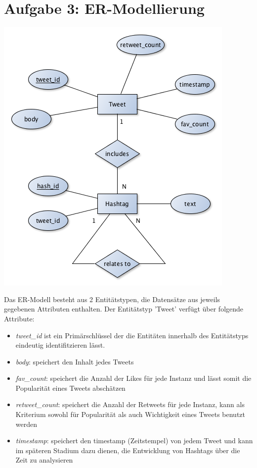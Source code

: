 \documentclass[12pt]{article}
\begin{document}
\section*{Aufgabe 3: ER-Modellierung}
\centerline{\includegraphics[scale=0.6]{img/img3.png} }
Das ER-Modell besteht aus 2 Entitätstypen, die Datensätze aus jeweils gegebenen Attributen enthalten.
Der Entitätstyp 'Tweet' verfügt über folgende Attribute:
\begin{itemize}
\item \textit{tweet\_id}  ist ein Primärschlüssel der die Entitäten innerhalb des Entitätstyps eindeutig identifitzieren lässt.
\item \textit{body}: speichert den Inhalt jedes Tweets 
\item \textit{fav\_count}: speichert die Anzahl der Likes für jede Instanz und lässt somit die Popularität eines Tweets abschätzen
\item \textit{retweet\_count}: speichert die Anzahl der Retweets für jede Instanz, kann als Kriterium sowohl für Popularität als auch  Wichtigkeit eines Tweets benutzt werden
\item \textit{timestamp}: speichert den timestamp (Zeitstempel) von jedem Tweet und kann im späteren Stadium dazu dienen, die Entwicklung von Hashtags über die Zeit zu analysieren
\end{itemize}
\end{document}
